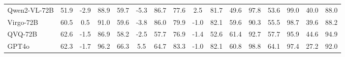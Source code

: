 \begin{table*}[!t]
{\begin{tabular}{l|ccc|ccc|ccc|cc|cc|cc}
Qwen2-VL-72B & 51.9 & -2.9 & 88.9 & 59.7 & -5.3 & 86.7 & 77.6 & 2.5 & 81.7 & 49.6 & 97.8 & 53.6 & \colorbox{backred!60}{99.0} & 40.0 & 88.0 \\
Virgo-72B & 60.5 & 0.5 & 91.0 & 59.6 & -3.8 & 86.0 & 79.9 & -1.0 & 82.1 & 59.6 & 90.3 & 55.5 & 98.7 & 39.6 & 88.2 \\
QVQ-72B & \colorbox{backred!60}{62.6} & -1.5 & 86.9 & 58.2 & -2.5 & 57.7 & 76.9 & -1.4 & 52.6 & \colorbox{backred!60}{61.4} & 92.7 & 57.7 & 95.9 & \colorbox{backred!60}{44.6} & 94.9 \\
GPT4o & 62.3 & -1.7 & 96.2 & \colorbox{backred!60}{66.3} & \colorbox{backred!60}{5.5} & 64.7 & \colorbox{backred!60}{83.3} & -1.0 & 82.1 & 60.8 & \colorbox{backred!60}{98.8} & \colorbox{backred!60}{64.1} & 97.4 & 27.2 & 92.0 \\
\bottomrule
\end{tabular}
}
\label{table:category_result}
\end{table*}